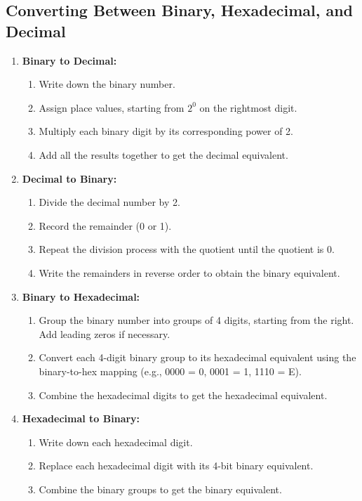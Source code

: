 \subsection{Converting Between Binary, Hexadecimal, and Decimal}
\begin{process}
\begin{enumerate}
    \item \textbf{Binary to Decimal:}
    \begin{enumerate}
        \item Write down the binary number.
        \item Assign place values, starting from $2^0$ on the rightmost digit.
        \item Multiply each binary digit by its corresponding power of 2.
        \item Add all the results together to get the decimal equivalent.
    \end{enumerate}
    
    \item \textbf{Decimal to Binary:}
    \begin{enumerate}
        \item Divide the decimal number by 2.
        \item Record the remainder (0 or 1).
        \item Repeat the division process with the quotient until the quotient is 0.
        \item Write the remainders in reverse order to obtain the binary equivalent.
    \end{enumerate}
    
    \item \textbf{Binary to Hexadecimal:}
    \begin{enumerate}
        \item Group the binary number into groups of 4 digits, starting from the right. Add leading zeros if necessary.
        \item Convert each 4-digit binary group to its hexadecimal equivalent using the binary-to-hex mapping (e.g., 0000 = 0, 0001 = 1, 1110 = E).
        \item Combine the hexadecimal digits to get the hexadecimal equivalent.
    \end{enumerate}
    
    \item \textbf{Hexadecimal to Binary:}
    \begin{enumerate}
        \item Write down each hexadecimal digit.
        \item Replace each hexadecimal digit with its 4-bit binary equivalent.
        \item Combine the binary groups to get the binary equivalent.
    \end{enumerate}
    

\end{enumerate}
\end{process}
